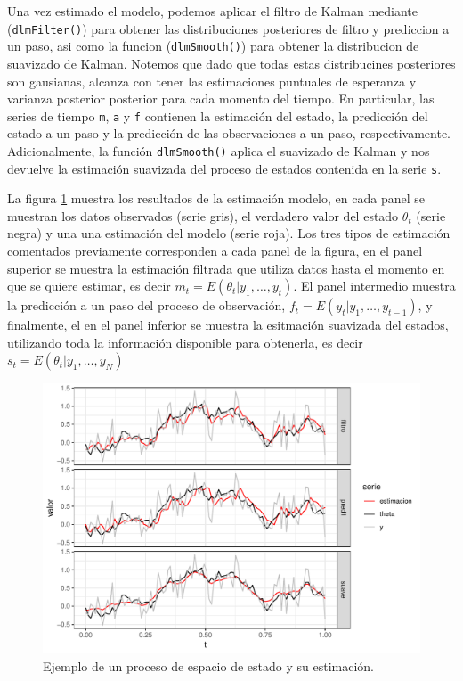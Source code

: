 \documentclass[12pt]{article}\usepackage[]{graphicx}\usepackage[]{color}
\makeatletter
\def\maxwidth{ %
  \ifdim\Gin@nat@width>\linewidth
    \linewidth
  \else
    \Gin@nat@width
  \fi
}
\newenvironment{knitrout}{}{} %
\makeatother
\begin{document}
Una vez estimado el modelo, podemos aplicar el filtro de Kalman mediante (\verb|dlmFilter()|) para obtener
las distribuciones posteriores de filtro y prediccion a un paso, asi como la funcion (\verb|dlmSmooth()|) para obtener la distribucion de suavizado de Kalman. Notemos que dado que todas estas distribucines posteriores son gausianas, alcanza con tener las estimaciones puntuales de esperanza y varianza posterior posterior para cada momento del tiempo. En particular, las series de tiempo \verb|m|, \verb|a| y \verb|f| contienen la estimación del estado, la predicción del estado a un paso y la predicción de las observaciones a un paso, respectivamente. Adicionalmente, la función \verb|dlmSmooth()| aplica el suavizado de Kalman y nos devuelve la estimación suavizada del proceso de estados contenida en la serie \verb|s|.

La figura \ref{fig:graf7b} muestra los resultados de la estimación modelo, en cada panel se muestran los datos observados (serie gris), el verdadero valor del estado $\theta_t$ (serie negra) y una una estimación del modelo (serie roja). Los tres tipos de estimación comentados previamente corresponden a cada panel de la figura, en el panel superior se muestra la estimación filtrada que utiliza datos hasta el momento en que se quiere estimar, es decir $m_t = E(\theta_t | y_1,\ldots, y_t)$. El panel intermedio muestra la predicción a un paso del proceso de observación, $f_t = E(y_t | y_1, \ldots, y_{t-1})$, y finalmente, el en el panel inferior se muestra la esitmación suavizada del estados, utilizando toda la información disponible para obtenerla, es decir $s_t = E(\theta_t | y_1, \ldots, y_N)$
\begin{knitrout}
\color{fgcolor}\begin{figure}

{\centering \includegraphics[width=\maxwidth]{figure/graf7b-1} 

}

\caption[Ejemplo de un proceso de espacio de estado y su estimación]{Ejemplo de un proceso de espacio de estado y su estimación.}\label{fig:graf7b}
\end{figure}


\end{knitrout}
\end{document}
